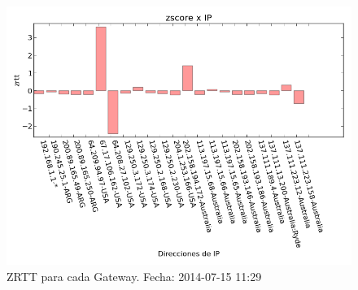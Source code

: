 \begin{figure}[H]
	\begin{center}
		  \includegraphics[scale=0.5]{../graficos_informe/mq_zscore_segunda_medicion.png}
		  \caption{ZRTT para cada Gateway. Fecha: 2014-07-15 11:29}
		  \label{fig:contra1}
	\end{center}
\end{figure}




